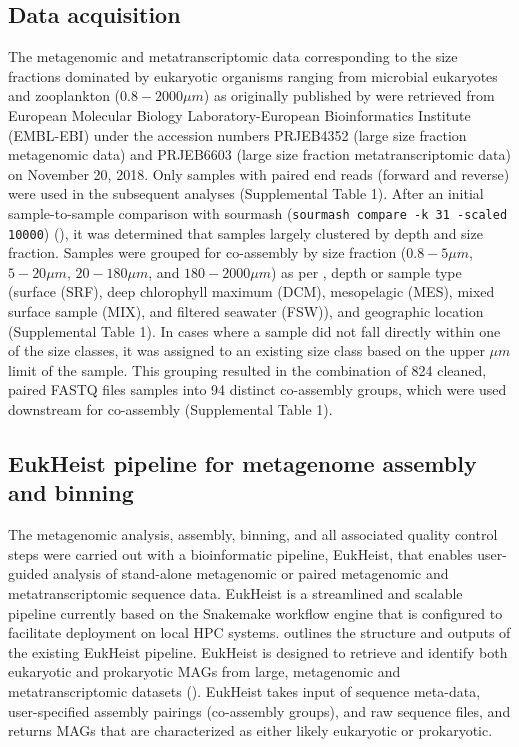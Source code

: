 \documentclass[12pt]{article}
\numberwithin{equation}{section}
\begin{document}
\subsection*{Data acquisition} The metagenomic and metatranscriptomic data corresponding to the size fractions dominated by eukaryotic organisms ranging from ﻿microbial eukaryotes and zooplankton ($0.8 -  2000 \mu m$) as originally published by \citet{Carradec2018global} were retrieved from ﻿European Molecular Biology Laboratory-European Bioinformatics Institute (EMBL-EBI) under the accession numbers PRJEB4352 (large size fraction metagenomic data) and PRJEB6603 (large size fraction metatranscriptomic data) on November 20, 2018. Only samples with paired end reads (forward and reverse) were used in the subsequent analyses (Supplemental Table 1). After an initial sample-to-sample comparison with sourmash (\texttt{sourmash compare -k 31 -scaled 10000}) \citep{Titus_Brown_2016} (), it was determined that samples largely clustered by depth and size fraction. Samples were grouped for co-assembly by size fraction ($0.8 - 5 \mu m$, $5-20 \mu m$, $20-180 \mu m$, and $180-2000 \mu m$) as per \citet{Carradec2018global}, depth or sample type (surface (SRF), deep chlorophyll maximum (DCM), mesopelagic (MES), mixed surface sample (MIX), and filtered seawater (FSW)), and geographic location (Supplemental Table 1). In cases where a sample did not fall directly within one of the size classes, it was assigned to an existing size class based on the upper $\mu m$ limit of the sample. This grouping resulted in the combination of 824 cleaned, paired FASTQ files samples into 94 distinct co-assembly groups, which were used downstream for co-assembly (Supplemental Table 1). 

\subsection*{EukHeist pipeline for metagenome assembly and binning}The metagenomic analysis, assembly, binning, and all associated quality control steps were carried out with a bioinformatic pipeline, EukHeist, that enables user-guided analysis of stand-alone metagenomic or paired metagenomic and metatranscriptomic sequence data. EukHeist is a streamlined and scalable pipeline currently based on the Snakemake workflow engine \citep{Koster2012} that is configured to facilitate deployment on local HPC systems.  outlines the structure and outputs of the existing EukHeist pipeline. EukHeist is designed to retrieve and identify both eukaryotic and prokaryotic MAGs from large, metagenomic and metatranscriptomic datasets (). EukHeist takes input of sequence meta-data, user-specified assembly pairings (co-assembly groups), and raw sequence files, and returns MAGs that are characterized as either likely eukaryotic or prokaryotic. 
\end{document}
